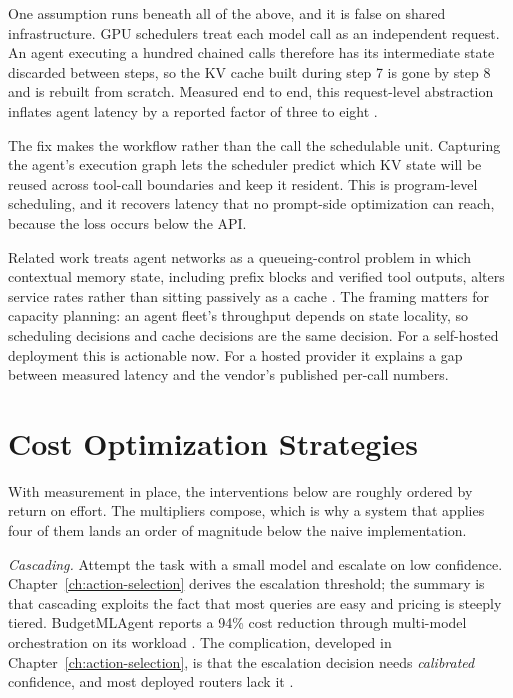 \documentclass[11pt]{book}
\begin{document}
One assumption runs beneath all of the above, and it is false on shared infrastructure. GPU schedulers treat each model call as an independent request. An agent executing a hundred chained calls therefore has its intermediate state discarded between steps, so the KV cache built during step 7 is gone by step 8 and is rebuilt from scratch. Measured end to end, this request-level abstraction inflates agent latency by a reported factor of three to eight \cite{saga2026}.

The fix makes the workflow rather than the call the schedulable unit. Capturing the agent's execution graph lets the scheduler predict which KV state will be reused across tool-call boundaries and keep it resident. This is program-level scheduling, and it recovers latency that no prompt-side optimization can reach, because the loss occurs below the API.

Related work treats agent networks as a queueing-control problem in which contextual memory state, including prefix blocks and verified tool outputs, alters service rates rather than sitting passively as a cache \cite{backpressure2026}. The framing matters for capacity planning: an agent fleet's throughput depends on state locality, so scheduling decisions and cache decisions are the same decision. For a self-hosted deployment this is actionable now. For a hosted provider it explains a gap between measured latency and the vendor's published per-call numbers.

\section{Cost Optimization Strategies}

With measurement in place, the interventions below are roughly ordered by return on effort. The multipliers compose, which is why a system that applies four of them lands an order of magnitude below the naive implementation.

\textit{Cascading.} Attempt the task with a small model and escalate on low confidence. Chapter~\ref{ch:action-selection} derives the escalation threshold; the summary is that cascading exploits the fact that most queries are easy and pricing is steeply tiered. BudgetMLAgent reports a 94\% cost reduction through multi-model orchestration on its workload \cite{budgetmlagent2024}. The complication, developed in Chapter~\ref{ch:action-selection}, is that the escalation decision needs \textit{calibrated} confidence, and most deployed routers lack it \cite{ucci2026}.
\end{document}
